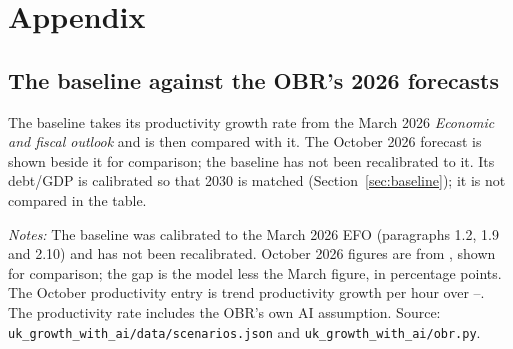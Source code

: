 \appendix
\section*{Appendix}
\renewcommand{\thesubsection}{A.\arabic{subsection}}
\setcounter{subsection}{0}

\subsection{The baseline against the OBR's 2026 forecasts}
\label{app:obr}

The baseline takes its productivity growth rate from the March 2026 \emph{Economic and fiscal outlook} and is then compared with it. The October 2026 forecast is shown beside it for comparison; the baseline has not been recalibrated to it. Its debt/GDP is calibrated so that 2030 is matched (Section~\ref{sec:baseline}); it is not compared in the table.

\begin{table}[htbp]
\centering
\caption{The baseline ($\zetaK = \genZetaKCentral{}$) against the OBR's March and October 2026 forecasts}
\label{tab:obr}
\small
{}
\par\medskip
\begin{minipage}{0.92\textwidth}
\footnotesize \emph{Notes:} The baseline was calibrated to the March 2026 EFO (paragraphs 1.2, 1.9 and 2.10) and has not been recalibrated. October 2026 figures are from \citet[Table~A.1]{obr2026efooctrep}, shown for comparison; the gap is the model less the March figure, in percentage points. The October productivity entry is trend productivity growth per hour over \genObrOctProductivityFirstYear--\genObrOctProductivityLastYear{}. The productivity rate includes the OBR's own AI assumption. Source: \texttt{uk\_growth\_with\_ai/data/scenarios.json} and \texttt{uk\_growth\_with\_ai/obr.py}.
\end{minipage}
\end{table}

